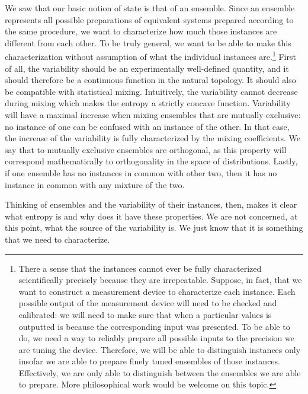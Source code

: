 We saw that our basic notion of state is that of an ensemble. Since an ensemble represents all possible preparations of equivalent systems prepared according to the same procedure, we want to characterize how much those instances are different from each other. To be truly general, we want to be able to make this characterization without assumption of what the individual instances are.\footnote{There a sense that the instances cannot ever be fully characterized scientifically precisely because they are irrepeatable. Suppose, in fact, that we want to construct a measurement device to characterize each instance. Each possible output of the measurement device will need to be checked and calibrated: we will need to make sure that when a particular values is outputted is because the corresponding input was presented. To be able to do, we need a way to reliably prepare all possible inputs to the precision we are tuning the device. Therefore, we will be able to distinguish instances only insofar we are able to prepare finely tuned ensembles of those instances. Effectively, we are only able to distinguish between the ensembles we are able to prepare. More philosophical work would be welcome on this topic.} First of all, the variability should be an experimentally well-defined quantity, and it should therefore be a continuous function in the natural topology. It should also be compatible with statistical mixing. Intuitively, the variability cannot decrease during mixing which makes the entropy a strictly concave function. Variability will have a maximal increase when mixing ensembles that are mutually exclusive: no instance of one can be confused with an instance of the other. In that case, the increase of the variability is fully characterized by the mixing coefficients. We say that to mutually exclusive ensembles are orthogonal, as this property will correspond mathematically to orthogonality in the space of distributions. Lastly, if one ensemble has no instances in common with other two, then it has no instance in common with any mixture of the two.

Thinking of ensembles and the variability of their instances, then, makes it clear what entropy is and why does it have these properties. We are not concerned, at this point, what the source of the variability is. We just know that it is something that we need to characterize.

